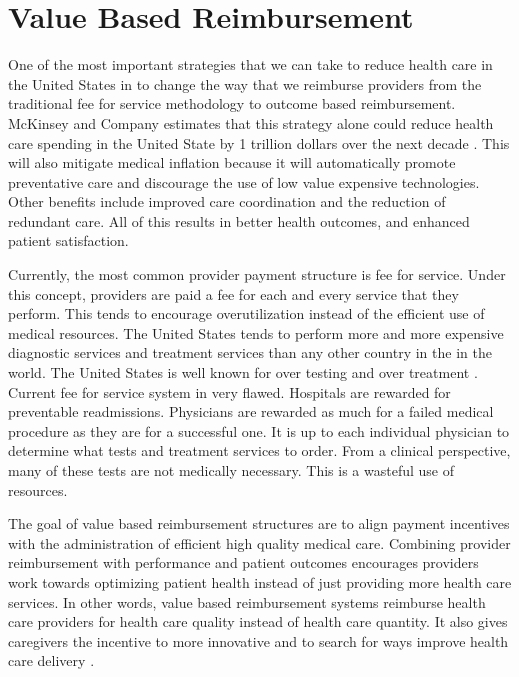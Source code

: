 \documentclass[sigconf]{acmart}
\begin{document}
\section{Value Based Reimbursement}
One of the most important strategies that we can take to reduce health care in the United States in to change the way that we reimburse providers from the traditional fee for service methodology to outcome based reimbursement.  McKinsey and Company estimates that this strategy alone could reduce health care spending in the United State by 1 trillion dollars over the next decade \cite{www-google-trillion}.  This will also mitigate medical inflation because it will automatically promote preventative care and discourage the use of low value expensive technologies.  Other benefits include   improved care coordination and the reduction of redundant care.  All of this results in better health outcomes, and enhanced patient satisfaction.

Currently, the most common provider payment structure is fee for service. Under this concept, providers are paid a fee for each and every service that they perform. This tends to encourage overutilization instead of the efficient use of medical resources. The United States tends to perform more and more expensive diagnostic services and treatment services than any other country in the in the world. The United States is well known for over testing and over treatment \cite{www-google-PBSO}.  Current fee for service system in very flawed. Hospitals are rewarded for preventable readmissions. Physicians are rewarded as much for a failed medical procedure as they are for a successful one.  It is up to each individual physician to determine what tests and treatment services to order.  From a clinical perspective, many of these tests are not medically necessary. This is a wasteful use of resources.

The goal of value based reimbursement structures are to align payment incentives with the administration of efficient high quality medical care. Combining provider reimbursement with performance and patient outcomes encourages providers work towards optimizing patient health instead of just providing more health care services. In other words, value based reimbursement systems reimburse health care providers for health care quality instead of health care quantity.   It also gives caregivers the incentive to more innovative and to search for ways improve health care delivery \cite{www-google-christian}.
\end{document}
